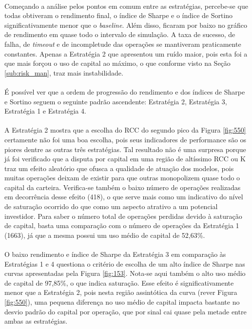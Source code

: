 \FloatBarrier

\paragraph{} Começando a análise pelos pontos em comum entre as estratégias, percebe-se que todas obtiveram o rendimento final, o índice de Sharpe e o índice de Sortino significativamente menor que o \textit{baseline}. Além disso, ficaram por baixo no gráfico de rendimento em quase todo o intervalo de simulação. A taxa de sucesso, de falha, de \textit{timeout} e de incompletude das operações se mantiveram praticamente constantes. Apenas a Estratégia 2 que apresentou um ruído maior, pois esta foi a que mais forçou o uso de capital ao máximo, o que conforme visto na Seção \ref{sub:risk_man}, traz mais instabilidade.

\paragraph{} É possível ver que a ordem de progressão do rendimento e dos índices de Sharpe e Sortino seguem o seguinte padrão ascendente: Estratégia 2, Estratégia 3, Estratégia 1 e Estratégia 4.

\paragraph{} A Estratégia 2 mostra que a escolha do RCC do segundo pico da Figura \ref{fig:550} certamente não foi uma boa escolha, pois seus indicadores de performance são os piores dentre as outras três estratégias. Tal resultado não é uma surpresa porque já foi verificado que a disputa por capital em uma região de altíssimo RCC ou K traz um efeito aleatório que ofusca a qualidade de atuação dos modelos, pois muitas operações deixam de existir para que outras monopolizem quase todo o capital da carteira. Verifica-se também o baixo número de operações realizadas em decorrência desse efeito (418), o que serve mais como um indicativo do nível de saturação ocorrido do que como um aspecto atrativo a um potencial investidor. Para saber o número total de operações perdidas devido à saturação de capital, basta uma comparação com o número de operações da Estratégia 1 (1663), já que a mesma possui um uso médio de capital de 52,63\%.

\paragraph{} O baixo rendimento e índice de Sharpe da Estratégia 3 em comparação às Estratégias 1 e 4 questiona o critério de escolha de um alto índice de Sharpe nas curvas apresentadas pela Figura \ref{fig:153}. Nota-se aqui também o alto uso médio de capital de 97,85\%, o que indica saturação. Esse efeito é significativamente menor que a Estratégia 2, pois nesta região assintótica da curva (rever Figura \ref{fig:550}), uma pequena diferença no uso médio de capital impacta bastante no desvio padrão do capital por operação, que por sinal cai quase pela metade entre ambas as estratégias.

